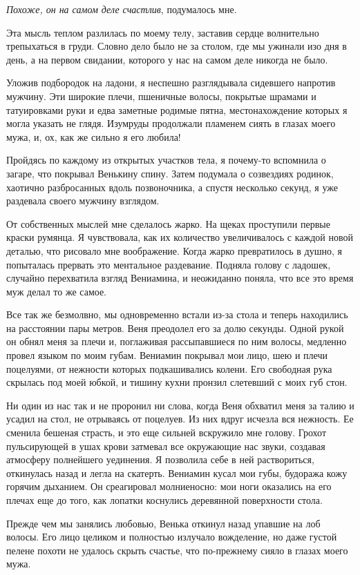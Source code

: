 \documentclass[
]{book}
\begin{document}
\emph{Похоже, он на самом деле счастлив}, подумалось мне.

Эта мысль теплом разлилась по моему телу, заставив сердце волнительно трепыхаться в груди. Словно дело было не за столом, где мы ужинали изо дня в день, а на первом свидании, которого у нас на самом деле никогда не было.

Уложив подбородок на ладони, я неспешно разглядывала сидевшего напротив мужчину. Эти широкие плечи, пшеничные волосы, покрытые шрамами и татуировками руки и едва заметные родимые пятна, местонахождение которых я могла указать не глядя. Изумруды продолжали пламенем сиять в глазах моего мужа, и, ох, как же сильно я его любила!

Пройдясь по каждому из открытых участков тела, я почему-то вспомнила о загаре, что покрывал Венькину спину. Затем подумала о созвездиях родинок, хаотично разбросанных вдоль позвоночника, а спустя несколько секунд, я уже раздевала своего мужчину взглядом.

От собственных мыслей мне сделалось жарко. На щеках проступили первые краски румянца. Я чувствовала, как их количество увеличивалось с каждой новой деталью, что рисовало мне воображение. Когда жарко превратилось в душно, я попыталась прервать это ментальное раздевание. Подняла голову с ладошек, случайно перехватила взгляд Вениамина, и неожиданно поняла, что все это время муж делал то же самое.

Все так же безмолвно, мы одновременно встали из-за стола и теперь находились на расстоянии пары метров. Веня преодолел его за долю секунды. Одной рукой он обнял меня за плечи и, поглаживая рассыпавшиеся по ним волосы, медленно провел языком по моим губам. Вениамин покрывал мои лицо, шею и плечи поцелуями, от нежности которых подкашивались колени. Его свободная рука скрылась под моей юбкой, и тишину кухни пронзил слетевший с моих губ стон.

Ни один из нас так и не проронил ни слова, когда Веня обхватил меня за талию и усадил на стол, не отрываясь от поцелуев. Из них вдруг исчезла вся нежность. Ее сменила бешеная страсть, и это еще сильней вскружило мне голову. Грохот пульсирующей в ушах крови затмевал все окружающие нас звуки, создавая атмосферу полнейшего уединения. Я позволила себе в ней раствориться, откинулась назад и легла на скатерть. Вениамин кусал мои губы, будоража кожу горячим дыханием. Он среагировал молниеносно: мои ноги оказались на его плечах еще до того, как лопатки коснулись деревянной поверхности стола.

Прежде чем мы занялись любовью, Венька откинул назад упавшие на лоб волосы. Его лицо целиком и полностью излучало вожделение, но даже густой пелене похоти не удалось скрыть счастье, что по-прежнему сияло в глазах моего мужа.
\end{document}
